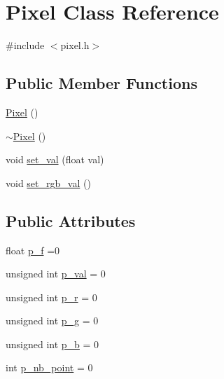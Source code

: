 \hypertarget{class_pixel}{}\section{Pixel Class Reference}
\label{class_pixel}


{\ttfamily \#include $<$pixel.\+h$>$}

\subsection*{Public Member Functions}
\begin{DoxyCompactItemize}
\item 
\hyperlink{class_pixel_a27ad99a2f705e635c42d242d530d4756}{Pixel} ()
\item 
\hyperlink{class_pixel_a30f6aaf9a1d8792245070860546fa365}{$\sim$\+Pixel} ()
\item 
void \hyperlink{class_pixel_a0064982203ecaf79cf79ecfa04fb4f1f}{set\+\_\+val} (float val)
\item 
void \hyperlink{class_pixel_a22150f6c19217b513d58ef7ec7bda6a9}{set\+\_\+rgb\+\_\+val} ()
\end{DoxyCompactItemize}
\subsection*{Public Attributes}
\begin{DoxyCompactItemize}
\item 
float \hyperlink{class_pixel_a7deda5be756322a5c31f6c2da641fd23}{p\+\_\+f} =0
\item 
unsigned int \hyperlink{class_pixel_ab220df144b119969f66eb5fb5d75c9bb}{p\+\_\+val} = 0
\item 
unsigned int \hyperlink{class_pixel_a837be2857d4fba78615f2fb78e28e67d}{p\+\_\+r} = 0
\item 
unsigned int \hyperlink{class_pixel_ab57c1d8eb36e078122374f40101648b4}{p\+\_\+g} = 0
\item 
unsigned int \hyperlink{class_pixel_a9521bc43c95cfcb25a11b03e176ad6a1}{p\+\_\+b} = 0
\item 
int \hyperlink{class_pixel_ad6e3f83bd8d6894e3e7516a19fcef096}{p\+\_\+nb\+\_\+point} = 0
\end{DoxyCompactItemize}


